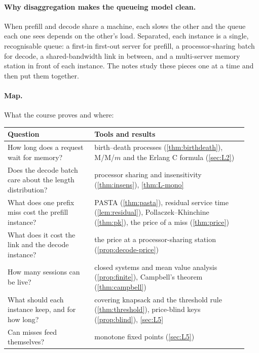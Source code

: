 \paragraph{Why disaggregation makes the queueing model clean.} When prefill and decode
share a machine, each slows the other and the queue each one sees depends on the
other's load. Separated, each instance is a single, recognisable queue: a first-in
first-out server for prefill, a processor-sharing batch for decode, a shared-bandwidth
link in between, and a multi-server memory station in front of each instance. The
notes study these pieces one at a time and then put them together.

\paragraph{Map.} What the course proves and where:

\begin{center}\small
\begin{tabular}{@{}p{0.34\linewidth}p{0.6\linewidth}@{}}
\toprule
Question & Tools and results \\
\midrule
How long does a request wait for memory? &
  birth--death processes (\cref{thm:birthdeath}), M/M/$m$ and the Erlang C formula
  (\cref{sec:L2}) \\
Does the decode batch care about the length distribution? &
  processor sharing and insensitivity (\cref{thm:insens}), \cref{thm:L-mono} \\
What does one prefix miss cost the prefill instance? &
  PASTA (\cref{thm:pasta}), residual service time (\cref{lem:residual}),
  Pollaczek--Khinchine (\cref{thm:pk}), the price of a miss (\cref{thm:price}) \\
What does it cost the link and the decode instance? &
  the price at a processor-sharing station (\cref{prop:decode-price}) \\
How many sessions can be live? &
  closed systems and mean value analysis (\cref{prop:finite}), Campbell's theorem
  (\cref{thm:campbell}) \\
What should each instance keep, and for how long? &
  covering knapsack and the threshold rule (\cref{thm:threshold}),
  price-blind keys (\cref{prop:blind}), \cref{sec:L5} \\
Can misses feed themselves? &
  monotone fixed points (\cref{sec:L5}) \\
\bottomrule
\end{tabular}
\end{center}

